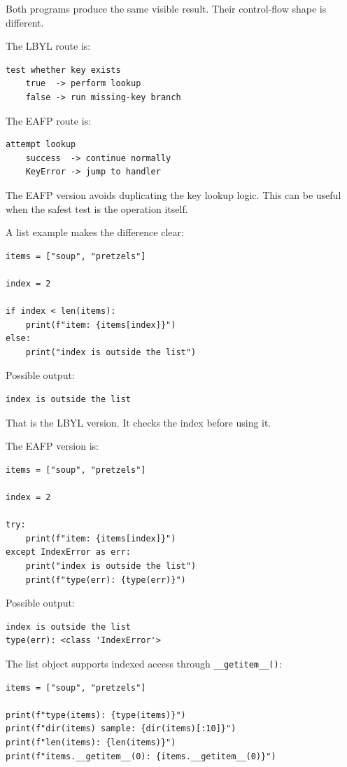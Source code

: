 \documentclass[a4paper,twoside]{report}
\begin{document}
Both programs produce the same visible result. Their control-flow shape is different.

The LBYL route is:

\begin{verbatim}
test whether key exists
    true  -> perform lookup
    false -> run missing-key branch
\end{verbatim}

The EAFP route is:

\begin{verbatim}
attempt lookup
    success  -> continue normally
    KeyError -> jump to handler
\end{verbatim}

The EAFP version avoids duplicating the key lookup logic. This can be useful when the safest test is the operation itself.

A list example makes the difference clear:

\begin{verbatim}
items = ["soup", "pretzels"]

index = 2

if index < len(items):
    print(f"item: {items[index]}")
else:
    print("index is outside the list")
\end{verbatim}

Possible output:

\begin{verbatim}
index is outside the list
\end{verbatim}

That is the LBYL version. It checks the index before using it.

The EAFP version is:

\begin{verbatim}
items = ["soup", "pretzels"]

index = 2

try:
    print(f"item: {items[index]}")
except IndexError as err:
    print("index is outside the list")
    print(f"type(err): {type(err)}")
\end{verbatim}

Possible output:

\begin{verbatim}
index is outside the list
type(err): <class 'IndexError'>
\end{verbatim}

The list object supports indexed access through \texttt{\_\_getitem\_\_()}:

\begin{verbatim}
items = ["soup", "pretzels"]

print(f"type(items): {type(items)}")
print(f"dir(items) sample: {dir(items)[:10]}")
print(f"len(items): {len(items)}")
print(f"items.__getitem__(0): {items.__getitem__(0)}")
\end{verbatim}
\end{document}
